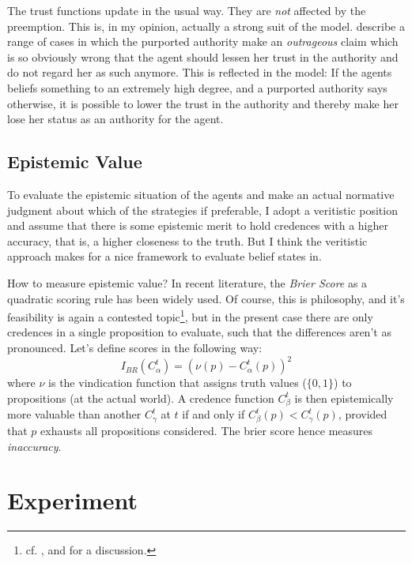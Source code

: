 \documentclass[11pt, a4paper]{scrartcl}
\renewcommand{\i}[1]{\emph{#1}}
\renewcommand{\a}{\alpha}
\begin{document}
The trust functions update in the usual way. They are \i{not} affected by the preemption. This is, in my opinion, actually a strong suit of the model. \textcite[p. XX]{Constantin2017} describe a range of cases in which the purported authority make an  \i{outrageous} claim which is so obviously wrong that the agent should lessen her trust in the authority and do not regard her as such anymore. This is reflected in the model: If the agents beliefs something to an extremely high degree, and a purported authority says otherwise, it is possible to lower the trust in the authority and thereby make her lose her status as an authority for the agent. 

\subsection{Epistemic Value}

To evaluate the epistemic situation of the agents and make an actual normative judgment about which of the strategies if preferable, I adopt a veritistic position and assume that there is some epistemic merit to hold credences with a higher accuracy, that is, a higher closeness to the truth. But I think the veritistic approach makes for a nice framework to evaluate belief states in. 

How to measure epistemic value? In recent literature, the \i{Brier Score} as a quadratic scoring rule has been widely used. Of course, this is philosophy, and it's feasibility is again a contested topic\footnote{cf. \textcite{Joyce1998-JOYANV}, \textcite{Maher2002-MAHJAF} and \textcite{Fallis2016} for a discussion.}, but in the present case there are only credences in a single proposition to evaluate, such that the differences aren't as pronounced. Let's define scores in the following way:
\begin{equation*}
    I_{BR}(C^t_\a) = {(\nu(p) - C^t_\a(p))}^2
\end{equation*}
where $\nu$ is the vindication function that assigns truth values ($\{0,1\}$) to propositions (at the actual world).
A credence function $C^t_\beta$ is then epistemically more valuable than another $C^t_\gamma$ at $t$ if and only if $C^t_\beta(p) < C^t_\gamma(p)$, provided that $p$ exhausts all propositions considered. The brier score hence measures \i{inaccuracy}.

\section{Experiment}
\end{document}
